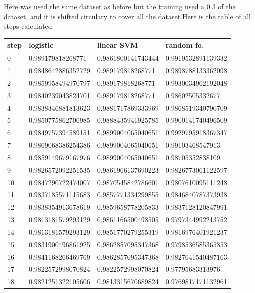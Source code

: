Here was used the same dataset as before but the training used a 0.3 of the dataset, and it is shifted circulary to cover all the dataset.Here is the table of all steps calculated \\
\begin{longtable} 
{|l |l |l |l |} 
\hline 
step  &logistic  &linear SVM  &random fo.  \\ \hline
0  &0.989179818268771  &0.9861800141743444  &0.9919532891139332  \\ \hline
1  &0.9848642886352729  &0.989179818268771  &0.9898788133362098  \\ \hline
2  &0.9859958494970797  &0.989179818268771  &0.9930034962192048  \\ \hline
3  &0.9840239043824701  &0.989179818268771  &0.98602505332677  \\ \hline
4  &0.9838346881813623  &0.9881717869333969  &0.9868519340790709  \\ \hline
5  &0.9850775862706985  &0.9888435941925785  &0.9900141740496509  \\ \hline
6  &0.9849757394589151  &0.9899004065040651  &0.9929795918367347  \\ \hline
7  &0.9869068386254386  &0.9899004065040651  &0.99103468547913  \\ \hline
8  &0.9859149679167976  &0.9899004065040651  &0.98705352838109  \\ \hline
9  &0.9826572092251535  &0.9861966137690223  &0.9826773061122597  \\ \hline
10  &0.9847290722474007  &0.9870545842786601  &0.9807610095111248  \\ \hline
11  &0.9837185571115683  &0.9857771334299855  &0.9846840787373938  \\ \hline
12  &0.9838354913678619  &0.9859658778205833  &0.9837128120847991  \\ \hline
13  &0.9813181579293129  &0.9861166500498505  &0.9797344992213752  \\ \hline
14  &0.9813181579293129  &0.9851770279255319  &0.9816976401921237  \\ \hline
15  &0.9831900496861925  &0.9862857095347368  &0.9798536585365853  \\ \hline
16  &0.9841168266469769  &0.9862857095347368  &0.9827641540487163  \\ \hline
17  &0.9822572998070824  &0.9822572998070824  &0.97795683313976  \\ \hline
18  &0.9821251322105606  &0.9813315670689824  &0.9769817171132961  \\ \hline

\end{longtable}
